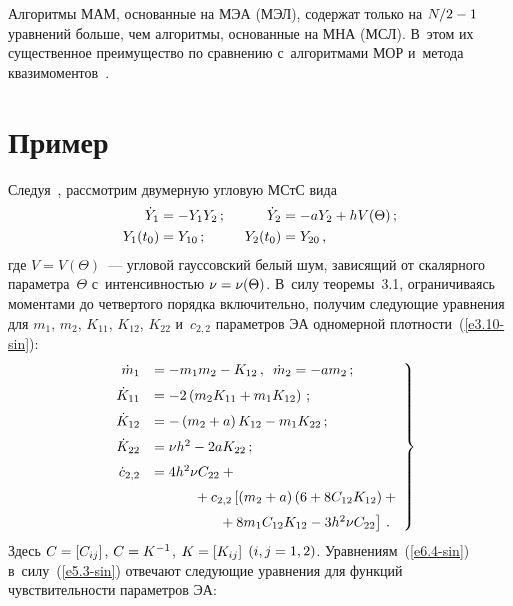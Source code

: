 \begin{multicols}{2}
Алгоритмы МАМ, основанные на МЭА (МЭЛ), содержат только на $N/2\hm-1$ уравнений 
больше, чем алгоритмы, основанные на МНА (МСЛ). В~этом их существенное преимущество 
по сравнению с~алгоритмами МОР и~метода квазимоментов~\cite{9-sin, 10-sin}.

\section{Пример}

Следуя~\cite{1-sin, 2-sin, 11-sin}, рассмотрим двумерную угловую МСтС вида
\begin{alignat*}{2}
\dot Y_1 &=-Y_1 Y_2 \,;&\enskip \dot Y_2 &= -a Y_2 + h V(\Theta)\,;\\
Y_1 (t_0) &= Y_{10}\,;&\enskip Y_2 (t_0) &= Y_{20}\,,
\end{alignat*}
где $V= V(\Theta)$~--- угловой гауссовский белый шум, зависящий от скалярного 
параметра~$\Theta$ с~интенсивностью  $\nu\hm=\nu(\Theta)$. В~силу теоремы~3.1, 
ограничиваясь моментами до четвертого порядка включительно, получим следующие 
уравнения для $m_1$, $m_2$, $K_{11}$, $K_{12}$, $K_{22}$ и~$c_{2,2}$ параметров 
ЭА одномерной плот\-ности~(\ref{e3.10-sin}):
\begin{equation}
\left.
\begin{array}{rl}
\dot m_1 &=-m_1m_2 - K_{12}\,,\enskip \dot m_2 = -a m_2\,;  %
\\[6pt]
\dot K_{11} &= -2 \left(m_2 K_{11} + m_1 K_{12}\right)\,;\\[6pt]
 \dot K_{12} &= - \left(m_2 + a\right) K_{12} - m_1 K_{22}\,;\\[6pt]
 \dot K_{22} &= \nu h^2 - 2 a K_{22}\,;
 \\[6pt]
 \dot c_{2,2} &= 4 h^2 \nu  C_{22} + {}\\[6pt]
 &\hspace*{10mm}{}+c_{2,2} \left[ \left(m_2 +a\right) 
\left(6+8C_{12} K_{12}\right) +{}\right.\\[6pt]
&\hspace*{16mm}\left.{}+ 8 m_1 C_{12} K_{12} - 3 h^2 \nu C_{22}\right]\,.
\end{array}\!\!
\right\}\!\!
\label{e6.4-sin}
\end{equation}
Здесь $C=\left[ C_{ij}\right]$, $C\hm=K^{-1}$, $K\hm= \lk K_{ij}\rk$ $(i,j\hm=1,2)$. 
Уравнениям~(\ref{e6.4-sin}) в~силу~(\ref{e5.3-sin}) 
отвечают следующие уравнения для функций чувствительности парамет\-ров ЭА:
\begin{equation}
\left.

\end{equation}
\end{multicols}
